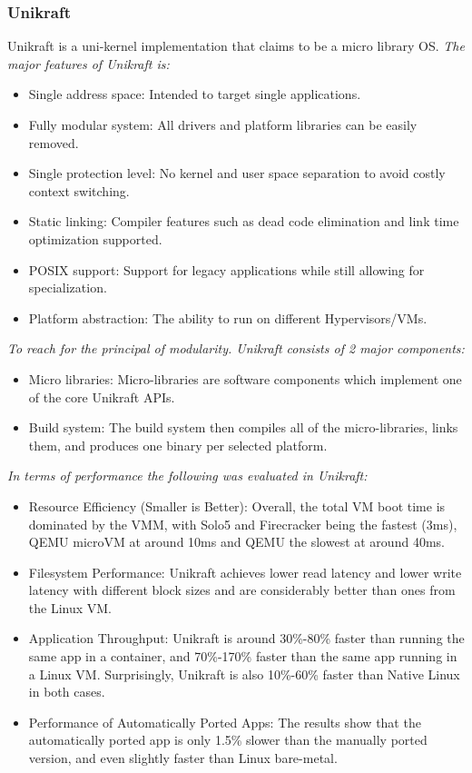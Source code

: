 \subsubsection{Unikraft \cite{Unikraft}}
Unikraft is a uni-kernel implementation that claims to be 
a micro library OS. \emph{The major features of Unikraft is:}
\begin{itemize}
  \item Single address space: Intended to target single applications.
  \item Fully modular system: All drivers and platform libraries can be easily removed.
  \item Single protection level: No kernel and user space separation to avoid costly context switching.
  \item Static linking: Compiler features such as dead code elimination and link time optimization supported. 
  \item POSIX support: Support for legacy applications while still allowing for specialization. 
  \item Platform abstraction: The ability to run on different Hypervisors/VMs. 
\end{itemize}
\emph{To reach for the principal of modularity. Unikraft consists of 2 major components:}
\begin{itemize}
  \item Micro libraries: Micro-libraries are software components 
  which implement one of the core Unikraft APIs.
  \item Build system: The build system
  then compiles all of the micro-libraries, links them,
  and produces one binary per selected platform.
\end{itemize}
\emph{In terms of performance the following was evaluated in Unikraft:}
\begin{itemize}
  \item Resource Efficiency (Smaller is Better): Overall, the total VM boot time is dominated by the VMM,
  with Solo5 and Firecracker being the fastest (3ms), QEMU
  microVM at around 10ms and QEMU the slowest at around
  40ms.
  \item Filesystem Performance: Unikraft
  achieves lower read latency and lower write latency with
  different block sizes and are considerably better than ones
  from the Linux VM.
  \item Application Throughput: Unikraft is around 30\%-80\% faster than running the same app
  in a container, and 70\%-170\% faster than the same app running 
  in a Linux VM. Surprisingly, Unikraft is also 10\%-60\%
  faster than Native Linux in both cases.
  \item Performance of Automatically Ported Apps: The results
  show that the automatically ported app is only 1.5\% slower
  than the manually ported version, and even slightly faster
  than Linux bare-metal.
\end{itemize}

